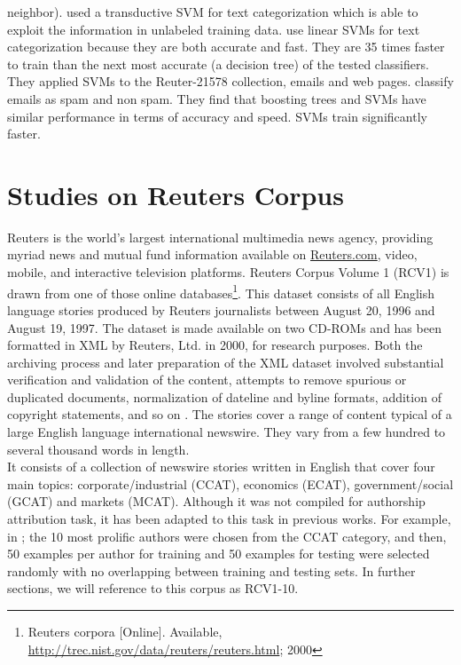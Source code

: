 neighbor). \citeauthor{joachims1999transductive} \cite{joachims1999transductive} used a transductive SVM for text categorization which is able to exploit the information in unlabeled training data.
\citeauthor{dumais1998inductive} \cite{dumais1998inductive} use linear SVMs for text categorization because they are both accurate and fast. They are 35 times faster to train than the next most accurate (a decision tree) of the tested classifiers. They applied SVMs to the Reuter-21578 collection, emails and web pages.
\citeauthor{drucker1999support} \cite{drucker1999support} classify emails as spam and non spam. They find that boosting trees and SVMs have similar performance in terms of accuracy and speed. SVMs train significantly faster.

\section{Studies on Reuters Corpus}
Reuters is the world’s largest international multimedia news agency, providing myriad news and mutual fund information available on \url{Reuters.com}, video, mobile, and interactive television platforms. Reuters Corpus Volume 1 (RCV1) is drawn from one of those online databases\footnote{Reuters corpora [Online]. Available, \url{http://trec.nist.gov/data/reuters/reuters.html}; 2000}. This dataset consists of all English language stories produced by Reuters journalists between August 20, 1996 and August 19, 1997. The dataset is made available on two CD-ROMs and has been formatted in XML by Reuters, Ltd. in 2000, for research purposes. Both the archiving process and later preparation of
the XML dataset involved substantial verification and validation of the content, attempts to remove spurious or duplicated documents, normalization of dateline and byline formats, addition of copyright statements, and so on \cite{cheng2011author}. The stories cover a range of content typical of a large English language international newswire. They vary from a few hundred to several thousand words in length.\\
It consists of a collection of newswire stories written in English that cover four main topics: corporate/industrial (CCAT), economics (ECAT), government/social (GCAT) and markets (MCAT).
Although it was not compiled for authorship attribution task, it has been adapted to this task in previous works. For example, in \cite{stamatatos2008author}; \cite{plakias2008tensor} the 10 most prolific authors were chosen from the CCAT category, and then, 50 examples per author for training and 50 examples for testing were selected randomly with no overlapping between training and testing sets. In further sections, we will reference to this corpus as RCV1-10.\\
